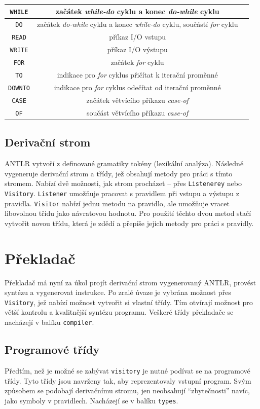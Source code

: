 \documentclass[
12pt,
a4paper,
pdftex,
czech,
titlepage
]{report}
\begin{document}
\begin{longtable}{|c|c|p{8cm}|}
\texttt{WHILE} & začátek \textit{while-do} cyklu a konec \textit{do-while} cyklu \\ \hline
\texttt{DO} & začátek \textit{do-while} cyklu a konec \textit{while-do} cyklu, součástí \textit{for} cyklu \\ \hline
\texttt{READ} & příkaz I/O vstupu \\ \hline
\texttt{WRITE} & příkaz I/O výstupu \\ \hline
\texttt{FOR} & začátek \textit{for} cyklu \\ \hline
\texttt{TO} & indikace pro \textit{for} cyklus přičítat k iterační proměnné \\ \hline
\texttt{DOWNTO} & indikace pro \textit{for} cyklus odečítat od iterační proměnné \\ \hline
\texttt{CASE} & začátek větvícího příkazu \textit{case-of} \\ \hline
\texttt{OF} & součást větvícího příkazu \textit{case-of} \\ \hline
\end{longtable}
	
\subsection{Derivační strom}
 
ANTLR vytvoří z definované gramatiky tokény (lexikální analýza). Následně vygeneruje derivační strom a třídy, jež obsahují metody pro práci s tímto stromem. Nabízí dvě možnosti, jak strom procházet -- přes \texttt{Listenerey} nebo \texttt{Visitory}. \texttt{Listener} umožňuje pracovat s pravidlem při vstupu a výstupu z pravidla. \texttt{Visitor} nabízí jednu metodu na pravidlo, ale umožňuje vracet libovolnou třídu jako návratovou hodnotu. Pro použití těchto dvou metod stačí vytvořit novou třídu, která je zdědí a přepíše jejich metody pro práci s pravidly.
 
\section{Překladač}
 
Překladač má nyní za úkol projít derivační strom vygenerovaný ANTLR, provést syntézu a vygenerovat instrukce. Po zralé úvaze je vybrána možnost přes \texttt{Visitory}, jež nabízí možnost vytvořit si vlastní třídy. Tím otvírají možnost pro větší kontrolu a kvalitnější syntézu programu. Veškeré třídy překladače se nacházejí v balíku \texttt{compiler}.
 
\subsection{Programové třídy}
Předtím, než je možné se zabývat \texttt{visitory} je nutné podívat se na programové třídy. Tyto třídy jsou navrženy tak, aby reprezentovaly vstupní program. Svým způsobem se podobají derivačnímu stromu, jen neobsahují ``zbytečnosti'' navíc, jako symboly v pravidlech. Nacházejí se v balíku \texttt{types}. 
 
\end{document}
